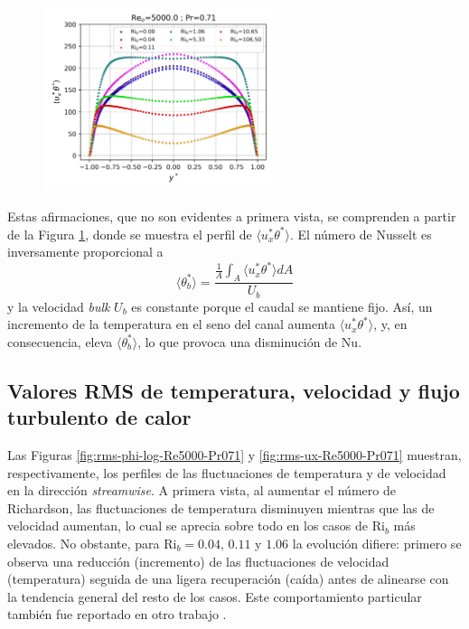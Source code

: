 
\begin{figure}[H]
  \centering
    \includegraphics[width=0.6\textwidth]{figures/cap5/Re5000-Pr071/uphi_profile.png}
 	 \caption{}
  \label{fig:uphi-Re5000-Pr071}
\end{figure}

Estas afirmaciones, que no son evidentes a primera vista, se comprenden a partir de la Figura \ref{fig:uphi-Re5000-Pr071}, donde se muestra el perfil de $\langle u_x^{*} \theta^{*} \rangle$. El número de Nusselt es inversamente proporcional a
$$\langle \theta^*_b \rangle = \frac{ \frac{1}{A} \int_A \langle u_x^* \theta^* \rangle dA}{U_b} $$
y la velocidad \textit{bulk} $U_b$ es constante porque el caudal se mantiene fijo. Así, un incremento de la temperatura en el seno del canal aumenta $\langle u_x^{*} \theta^{*} \rangle$, y, en consecuencia, eleva $\langle \theta_b^{*} \rangle$, lo que provoca una disminución de Nu.

\subsection{Valores RMS de temperatura, velocidad y flujo turbulento de calor} 

Las Figuras \ref{fig:rms-phi-log-Re5000-Pr071} y \ref{fig:rms-ux-Re5000-Pr071} muestran, respectivamente, los perfiles de las fluctuaciones de temperatura y de velocidad en la dirección \textit{streamwise}. A primera vista, al aumentar el número de Richardson, las fluctuaciones de temperatura disminuyen mientras que las de velocidad aumentan, lo cual se aprecia sobre todo en los casos de Ri$_b$ más elevados. No obstante, para Ri$_b = 0{.}04$, $0{.}11$ y $1{.}06$ la evolución difiere: primero se observa una reducción (incremento) de las fluctuaciones de velocidad (temperatura) seguida de una ligera recuperación (caída) antes de alinearse con la tendencia general del resto de los casos. Este comportamiento particular también fue reportado en otro trabajo \cite{you2003direct}.

